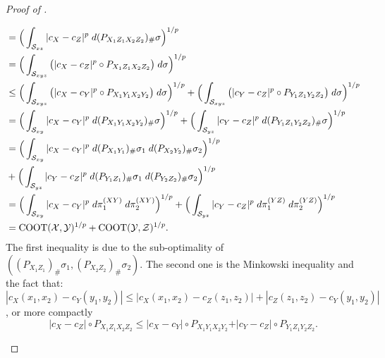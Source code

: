 \begin{proof}[Proof of ]
\begin{enumerate}
\begin{equation}
\begin{split}
          &= \Big( \int_{\mathcal S_{xz}} \vert c_X - c_Z \vert^p
          \; d(P_{X_1 Z_1 X_2 Z_2})_{\#} \sigma \Big)^{1/p} \\
          &= \Big( \int_{\mathcal S_{xyz}} \big( \vert c_X - c_Z \vert^p \circ P_{X_1 Z_1 X_2 Z_2} \big)
          \; d \sigma \Big)^{1/p} \\
          &\leq \Big( \int_{\mathcal S_{xyz}} \big( \vert c_X - c_Y \vert^p \circ P_{X_1 Y_1 X_2 Y_2} \big)
          \; d \sigma \Big)^{1/p} +
          \Big( \int_{\mathcal S_{xyz}} \big( \vert c_Y - c_Z \vert^p \circ P_{Y_1 Z_1 Y_2 Z_2} \big)
          \; d \sigma \Big)^{1/p} \\
          &= \Big( \int_{\mathcal S_{xy}} \vert c_X - c_Y \vert^p
          \; d (P_{X_1 Y_1 X_2 Y_2})_{\#} \sigma \Big)^{1/p}  +
          \Big( \int_{\mathcal S_{yz}} \vert c_Y - c_Z \vert^p
          \; d (P_{Y_1 Z_1 Y_2 Z_2})_{\#} \sigma \Big)^{1/p}  \\
          &= \Big( \int_{\mathcal S_{xy}} \vert c_X - c_Y \vert^p
          \; d (P_{X_1 Y_1})_{\#} \sigma_1 \; d (P_{X_2 Y_2})_{\#} \sigma_2 \Big)^{1/p} \\
          &+ \Big( \int_{\mathcal S_{yz}} \vert c_Y - c_Z \vert^p
          \; d (P_{Y_1 Z_1})_{\#} \sigma_1 \; d (P_{Y_2 Z_2})_{\#} \sigma_2 \Big)^{1/p} \\
          &= \Big( \int_{\mathcal S_{xy}} \vert c_X - c_Y \vert^p \; d \pi^{(XY)}_1 \; d \pi^{(XY)}_2 \Big)^{1/p}  +
          \Big( \int_{\mathcal S_{yz}} \vert c_Y - c_Z \vert^p \; d \pi^{(YZ)}_1 \; d \pi^{(YZ)}_2 \Big)^{1/p} \\
          &= \text{COOT}(\mathcal X, \mathcal Y)^{1/p} + \text{COOT}(\mathcal Y, \mathcal Z)^{1/p}.
        \end{split}
      \end{equation}
      The first inequality is due to the sub-optimality of
      $((P_{X_1 Z_1})_{\#} \sigma_1, (P_{X_2 Z_2})_{\#} \sigma_2)$. The second one is
      the Minkowski inequality and the fact that:
      $|c_X(x_1,x_2) - c_Y(y_1,y_2)| \leq |c_X(x_1,x_2) - c_Z(z_1,z_2)| + |c_Z(z_1,z_2) - c_Y(y_1,y_2)|$,
      or more compactly
      \begin{equation}
        \vert c_X - c_Z \vert \circ P_{X_1 Z_1 X_2 Z_2} \leq
        \vert c_X - c_Y \vert \circ P_{X_1 Y_1 X_2 Y_2} +
        \vert c_Y - c_Z \vert \circ P_{Y_1 Z_1 Y_2 Z_2}.
      \end{equation}
    \end{enumerate}
\end{proof}

